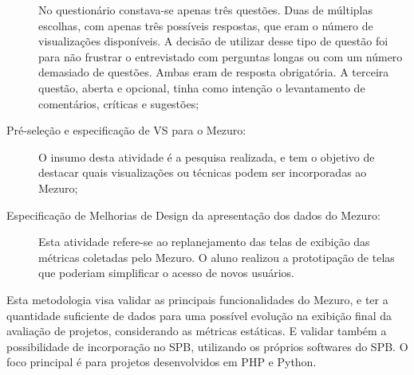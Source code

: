 \begin{description}
    No questionário constava-se apenas três questões. Duas de múltiplas escolhas,
    com apenas três possíveis respostas, que eram o número de visualizações
    disponíveis. A decisão de utilizar desse tipo de questão foi para não
    frustrar o entrevistado com perguntas longas ou com um número demasiado de
    questões. Ambas eram de resposta obrigatória. A terceira questão, aberta e
    opcional, tinha como intenção o levantamento de comentários, críticas e
    sugestões;

  \item [Pré-seleção e especificação de VS para o Mezuro:]
    O insumo desta atividade é a pesquisa realizada, e tem o objetivo de
    destacar quais visualizações ou técnicas podem ser incorporadas ao Mezuro;

  \item [Especificação de Melhorias de Design da apresentação dos dados do Mezuro:]
    Esta atividade refere-se ao replanejamento das telas de exibição das
    métricas coletadas pelo Mezuro. O aluno realizou a prototipação de telas que
    poderiam simplificar o acesso de novos usuários.

\end{description}


Esta metodologia visa validar as principais funcionalidades do Mezuro, e ter a
quantidade suficiente de dados para uma possível evolução na exibição final da
avaliação de projetos, considerando as métricas estáticas. E validar também a
possibilidade de incorporação no SPB, utilizando os próprios softwares do SPB.
O foco principal é para projetos desenvolvidos em PHP e Python.


